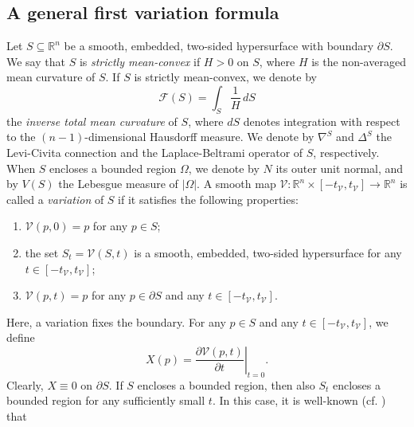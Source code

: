 \documentclass[11pt]{amsart}
\newcommand{\F}{\mathcal F}
\newcommand{\rr}{{\mathbb{R}}}
\newcommand{\Om}{\Omega}
\DeclareMathOperator{\trace}{trace}
\theoremstyle{definition}
\theoremstyle{remark}
\numberwithin{equation}{section}
\begin{document}
	\subsection{A general first variation formula}\label{subsec_firstvarform}
	Let $S\subseteq\rr^n$ be a smooth, embedded, two-sided hypersurface with boundary $\partial S$. %
	We say that $S$ is \emph{strictly mean-convex} if $H>0$ on $S$, where $H$ is the non-averaged mean curvature of $S$. If $S$ is strictly mean-convex, we denote by
	\begin{equation*}
		\F(S)=\int_S\frac{1}{H}\,dS
	\end{equation*}
	the \emph{inverse total mean curvature} of $S$, where $dS$ denotes integration with respect to the $(n-1)$-dimensional Hausdorff measure. We denote by $\nabla^S$ and $\Delta^S$ the Levi-Civita connection and the Laplace-Beltrami operator of $S$, respectively. When $S$ encloses a bounded region $\Om$, we denote by $N$ its outer unit normal, and by $V(S)$ the Lebesgue measure of $|\Om|$. A smooth map $\mathcal V:\rr^n\times[-t_{\mathcal V},t_{\mathcal V}]\to\rr^n$
	is called a \emph{variation} of $S$ if it satisfies the following properties:
	\medskip
	\begin{enumerate}
		\item[(i)] $\mathcal V(p,0)=p$ for any $p\in S$;
		\medskip
		\item[(ii)] the set $S_t=\mathcal V(S,t)$ is a smooth, embedded, two-sided hypersurface for any $t\in [-t_{\mathcal V},t_{\mathcal V}]$;
		\medskip
		\item[(iii)] $\mathcal V(p,t)=p$ for any $p\in\partial S$ and any $t\in [-t_{\mathcal V},t_{\mathcal V}]$.
	\end{enumerate}
	Here, a variation fixes the boundary. For any $p\in S$ and any $t\in [-t_{\mathcal V},t_{\mathcal V}]$, we define 
	\begin{equation*}
		X(p)=\left.\frac{\partial \mathcal V(p,t)}{\partial t}\right|_{t=0}.
	\end{equation*}
	Clearly, $X\equiv 0$ on $\partial S$. If $S$ encloses a bounded region, then also $S_t$ encloses a bounded region for any sufficiently small $t$.  In this case, it is well-known (cf. \cite{MR4676392}) that 
\end{document}
